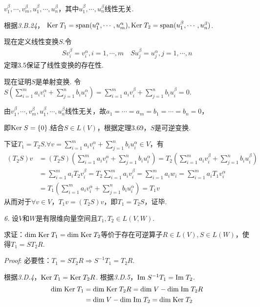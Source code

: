 \(v_1^\beta,\cdots,v_m^\beta,u_1^\beta,\cdots,u_n^\beta\)，其中\(u_1^\beta,\cdots,u_n^\beta\)线性无关.

根据\textit{3.B.24}，
\(\mathrm{Ker \;} T_1=\mathrm{span} (u_1^\alpha,\cdots,u_m^\alpha),\mathrm{Ker \;} T_2=\mathrm{span} (u_1^\beta,\cdots,u_n^\beta)\).

现在定义线性变换\(S\).令
    \begin{align*}
        Sv_i^\beta=v_i^\alpha,i=1,\cdots,m \quad
        Su_j^\beta=u_j^\alpha,j=1,\cdots,n
    \end{align*}
定理3.5保证了线性变换的存在性.

现在证明\(S\)是单射变换.
令\(S(\sum_{i=1}^m a_iv_i^\alpha+\sum_{j=1}^n b_iu_i^\alpha)=\sum_{i=1}^m a_iv_i^\beta+\sum_{j=1}^n b_iu_i^\beta=0\).

由\(v_1^\beta,\cdots,v_m^\beta,u_1^\beta,\cdots,u_n^\beta\)线性无关，故\(a_1=\cdots=a_m=b_1=\cdots=b_n=0\)，

即\(\mathrm{Ker \;} S=\{0\}\).结合\(S \in L(V)\)，根据定理3.69，\(S\)是可逆变换.

下证\(T_1=T_2S\).\(\forall v=\sum_{i=1}^m a_iv_i^\alpha+\sum_{j=1}^n b_iu_i^\alpha \in V\)，有
    \begin{align*}
        (T_2S)v&=(T_2S)(\sum_{i=1}^m a_iv_i^\alpha+\sum_{j=1}^n b_iu_i^\alpha )
                =T_2(\sum_{i=1}^m a_iv_i^\beta+\sum_{j=1}^n b_iu_i^\beta ) \\
            &=\sum_{i=1}^m a_iT_2v_i^\beta=T_2\sum_{i=1}^m a_iv_i^\beta
                =\sum_{i=1}^m a_iw_i=\sum_{i=1}^m a_iT_1v_i^\alpha \\
            &=T_1(\sum_{i=1}^m a_iv_i^\alpha+\sum_{j=1}^n b_iu_i^\alpha)=T_1v
    \end{align*}
从而对于\(\forall v \in V\)，\(T_1v=(T_2S)v\)，即\(T_1=T_2S\)，证毕.

\newpage

\textit{6.}
设\(V\)和\(W\)是有限维向量空间且\(T_1,T_2 \in L(V,W)\).

求证：\(\mathrm{dim \;} \mathrm{Ker \;} T_1=\mathrm{dim \;} \mathrm{Ker \;} T_2\)等价于存在可逆算子\(R \in L(V),S \in L(W)\)，使得\(T_1=ST_2R\).

\textit{Proof}:
必要性：\(T_1=ST_2R \Rightarrow S^{-1}T_1=T_2R\).

根据\textit{3.D.4}，\(\mathrm{Ker \;} T_1=\mathrm{Ker \;} T_2R\).
根据\textit{3.D.5}，\(\mathrm{Im \;} S^{-1}T_1=\mathrm{Im \;} T_2\).
    \begin{align*}
        \mathrm{dim \;} \mathrm{Ker \;} T_1 &=\mathrm{dim \;} \mathrm{Ker \;} T_2R=\mathrm{dim \;} V-\mathrm{dim \;} \mathrm{Im \;} T_2R \\
        &=\mathrm{dim \;} V-\mathrm{dim \;} \mathrm{Im \;} T_2=\mathrm{dim \;} \mathrm{Ker \;} T_2
    \end{align*}

